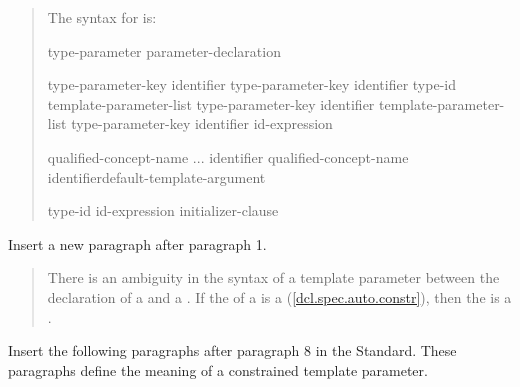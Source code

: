 \begin{quote}
\pnum
The syntax for  is:

\begin{bnf}
\br
  type-parameter\br
  parameter-declaration\br
\end{bnf}

\begin{bnf}
\br
  type-parameter-key \opt identifier\opt\br
  type-parameter-key identifier\opt{} \terminal{=} type-id\br
   template-parameter-list \terminal{>} type-parameter-key \opt identifier\opt\br
   template-parameter-list \terminal{>} type-parameter-key identifier\opt{} \terminal{=} id-expression
\end{bnf}

\begin{bnf}
\br
  \br
\end{bnf}

\begin{bnf}
\begin{addedblock}
\br
  qualified-concept-name ... identifier\opt\br
  qualified-concept-name identifier\opt default-template-argument\opt

\br
  \terminal{=} type-id\br
  \terminal{=} id-expression\br
  \terminal{=} initializer-clause
\end{addedblock}
\end{bnf}
\end{quote}

Insert a new paragraph after paragraph 1.

\begin{quote}
\begin{addedblock}
\pnum
There is an ambiguity in the syntax of a template parameter between the
declaration of a  and a
.
% 
If the  of a  
is a  (\ref{dcl.spec.auto.constr}), 
then the  is a .
\end{addedblock}
\end{quote}

Insert the following paragraphs after paragraph 8 in the \Cpp Standard. These 
paragraphs define the meaning of a constrained template parameter.

